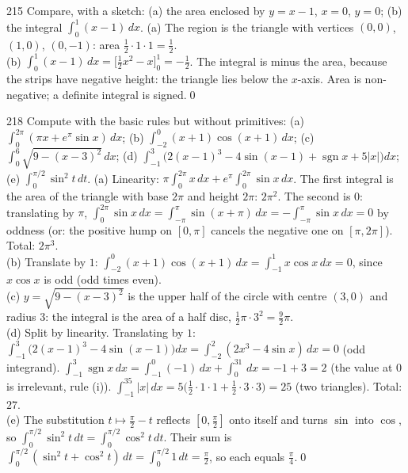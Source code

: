 \begin{bookex}{215}
Compare, with a sketch: (a) the area enclosed by $y=x-1$, $x=0$, $y=0$; (b) the integral $\int_0^1(x-1)\,dx$.
\solution
(a) The region is the triangle with vertices $(0,0)$, $(1,0)$, $(0,-1)$: area $\frac12\cdot1\cdot1=\frac12$.\\
(b) $\int_0^1(x-1)\,dx=\big[\tfrac12x^2-x\big]_0^1=-\tfrac12$. The integral is minus the area, because the strips have negative height: the triangle lies below the $x$-axis. Area is non-negative; a definite integral is signed.\qed
\end{bookex}

\begin{bookex}{218}
Compute with the basic rules but without primitives: (a) $\int_0^{2\pi}(\pi x+e^\pi\sin x)\,dx$; (b) $\int_{-2}^0(x+1)\cos(x+1)\,dx$; (c) $\int_0^6\sqrt{9-(x-3)^2}\,dx$; (d) $\int_{-1}^3\big(2(x-1)^3-4\sin(x-1)+\operatorname{sgn}x+5|x|\big)dx$; (e) $\int_0^{\pi/2}\sin^2t\,dt$.
\solution
(a) Linearity: $\pi\int_0^{2\pi}x\,dx+e^\pi\int_0^{2\pi}\sin x\,dx$. The first integral is the area of the triangle with base $2\pi$ and height $2\pi$: $2\pi^2$. The second is $0$: translating by $\pi$, $\int_0^{2\pi}\sin x\,dx=\int_{-\pi}^{\pi}\sin(x+\pi)\,dx=-\int_{-\pi}^\pi\sin x\,dx=0$ by oddness (or: the positive hump on $[0,\pi]$ cancels the negative one on $[\pi,2\pi]$). Total: $2\pi^3$.\\
(b) Translate by $1$: $\int_{-2}^0(x+1)\cos(x+1)\,dx=\int_{-1}^1x\cos x\,dx=0$, since $x\cos x$ is odd (odd times even).\\
(c) $y=\sqrt{9-(x-3)^2}$ is the upper half of the circle with centre $(3,0)$ and radius $3$: the integral is the area of a half disc, $\frac12\pi\cdot3^2=\frac92\pi$.\\
(d) Split by linearity. Translating by $1$: $\int_{-1}^3\big(2(x-1)^3-4\sin(x-1)\big)dx=\int_{-2}^2(2x^3-4\sin x)\,dx=0$ (odd integrand). $\int_{-1}^3\operatorname{sgn}x\,dx=\int_{-1}^0(-1)\,dx+\int_0^31\,dx=-1+3=2$ (the value at $0$ is irrelevant, rule (i)). $\int_{-1}^35|x|\,dx=5\big(\tfrac12\cdot1\cdot1+\tfrac12\cdot3\cdot3\big)=25$ (two triangles). Total: $27$.\\
(e) The substitution $t\mapsto\frac\pi2-t$ reflects $[0,\frac\pi2]$ onto itself and turns $\sin$ into $\cos$, so $\int_0^{\pi/2}\sin^2t\,dt=\int_0^{\pi/2}\cos^2t\,dt$. Their sum is $\int_0^{\pi/2}(\sin^2t+\cos^2t)\,dt=\int_0^{\pi/2}1\,dt=\frac\pi2$, so each equals $\frac\pi4$.\qed
\end{bookex}

